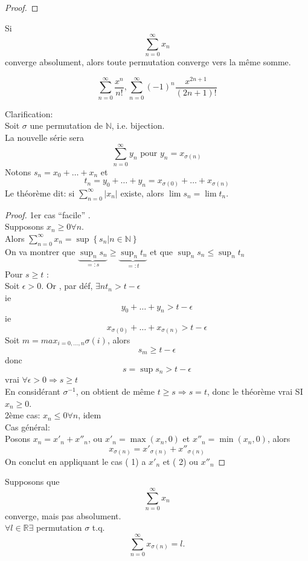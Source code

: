 \documentclass[../main.tex]{subfiles}
\begin{document}
\begin{exemple}
\begin{proof}
\end{proof}
\begin{thm}
Si 
\[ 
\sum_{n=0}^{ \infty} x_n 
\]
converge absolument, alors toute permutation converge vers la même somme.
\end{thm}
\begin{exemple}
\[ 
	\sum_{n=0}^{ \infty} \frac{x^{n}}{n!}, \sum_{n=0}^{ \infty} (-1)^{n} \frac{x^{2n+1}}{(2n+1)!}
\]
\end{exemple}
Clarification:\\
Soit $\sigma$ une permutation de $\mathbb{N}$, i.e. bijection.\\
La nouvelle série sera
\[ 
	\sum_{n=0}^{ \infty} y_n \text{ pour } y_n = x_{\sigma(n)} 
\]
Notons $s_n = x_0 + \ldots + x_n$ et 
\[ 
	t_n = y_0 + \ldots + y_n = x_{\sigma(0)} + \ldots + x_{\sigma(n)} 
\]
Le théorème dit: si $ \sum_{n=0}^{ \infty} |x_n|$ existe, alors $\lim s_n = \lim t_n$.
\begin{proof}
1er cas ``facile'' .\\
Supposons $x_n \geq 0 \forall n$.\\
Alors $ \sum_{n=0}^{ \infty} x_n = \sup \left\{ s_n | n \in \mathbb{N} \right\} $\\
On va montrer que $ \underbrace{\sup_n s_n}_{=:s} \geq \underbrace{\sup_n t_n}_{=:t}$ et que $ \sup_n s_n \leq \sup_n t_n$\\
Pour $s \geq t$ : \\
Soit $\epsilon > 0$. Or , par déf, $\exists n t_n > t - \epsilon$\\
ie
\[ 
y_0 + \ldots + y_n > t- \epsilon
\]
ie
\[ 
	x_{\sigma(0)} + \ldots + x_{\sigma(n)} > t - \epsilon
\]
Soit $m = max_{i=0,\ldots, n} \sigma(i)$, alors
\[ 
s_m \geq t - \epsilon
\]
donc 
\[ 
s = \sup s_n > t - \epsilon
\]
vrai $\forall \epsilon> 0 \Rightarrow  s \geq t$\\
En considérant $\sigma ^{-1}$, on obtient de même $t \geq s \Rightarrow s =t$, donc
le théorème vrai SI $x_n \geq 0$.\\
2ème cas: $x_n \leq 0 \forall n$, idem\\
Cas général:\\
Posons $x_n = x'_n + x''_n$, ou
$x'_n = \max(x_n,0)$ et $x''_n = \min(x_n,0)$, alors
 \[ 
	 x_{\sigma(n)}  = x'_{\sigma(n)}  + x''_{\sigma(n)}
\]
On conclut en appliquant le cas ( 1) a  $x'_n$ et ( 2) ou $x''_n$
\end{proof}
\begin{thm}
Supposons que 
\[ 
\sum_{n=0}^{ \infty} x_n
\]
converge, mais pas absolument.\\
$\forall l \in \mathbb{R} \exists $ permutation $\sigma$ t.q.
\[ 
	\sum_{n=0}^{ \infty} x_{\sigma(n)}  = l.
\]

\end{thm}


\end{exemple}
\end{document}
